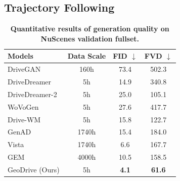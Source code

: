 \documentclass{article}
\newcommand{\TODO}[1]{\textcolor{blue}{TODO: #1}}
\begin{document}



\subsection{Trajectory Following}
\label{sec:result_trajectory}

\begin{table} %
   \small
   \centering
   \scriptsize
   \vspace{-5mm}
   \caption{\textbf{Quantitative results of generation quality on NuScenes validation fullset.}}
   \label{tab:quanti_full}
   \begin{tabular}{lccc}
     \toprule
     \textbf{Models} & \textbf{Data Scale} & \textbf{FID} $\downarrow$ & \textbf{FVD} $\downarrow$ \\
     \midrule
     DriveGAN~\cite{kim2021drivegan} & 160h & 73.4 & 502.3 \\
     DriveDreamer~\cite{wang2023drivedreamer} & 5h & 14.9 & 340.8 \\
     DriveDreamer-2~\cite{zhao2024drivedreamer} & 5h & 25.0 & 105.1  \\
     WoVoGen~\cite{lu2025wovogen} & 5h & 27.6 & 417.7  \\
     Drive-WM~\cite{min2024driveworld} & 5h & 15.8 & 122.7  \\
     GenAD~\cite{yang2024generalized} & 1740h & 15.4 & 184.0  \\
     \midrule
     Vista~\cite{gao2024vista} & 1740h & 6.6 & 167.7  \\
     GEM~\cite{hassan2024gem} & 4000h & 10.5 & 158.5 \\
     GeoDrive (Ours) & 5h & \textbf{4.1} & \textbf{61.6} \\
     \bottomrule
   \end{tabular}
   \vspace{-5mm}
\end{table}
\end{document}
